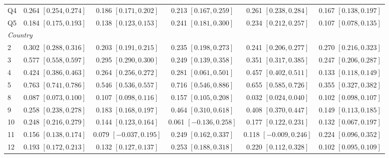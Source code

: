\begin{landscape}
\begin{longtable}{lccccc}
Q4 & 0.264 {\scriptsize$[0.254,0.274]$} & 0.186 {\scriptsize$[0.171,0.202]$} & 0.213 {\scriptsize$[0.167,0.259]$} & 0.261 {\scriptsize$[0.238,0.284]$} & 0.167 {\scriptsize$[0.138,0.197]$} \\
Q5 & 0.184 {\scriptsize$[0.175,0.193]$} & 0.138 {\scriptsize$[0.123,0.153]$} & 0.241 {\scriptsize$[0.181,0.300]$} & 0.234 {\scriptsize$[0.212,0.257]$} & 0.107 {\scriptsize$[0.078,0.135]$} \\
\midrule
\multicolumn{6}{l}{\textit{Country}} \\
2 & 0.302 {\scriptsize$[0.288,0.316]$} & 0.203 {\scriptsize$[0.191,0.215]$} & 0.235 {\scriptsize$[0.198,0.273]$} & 0.241 {\scriptsize$[0.206,0.277]$} & 0.270 {\scriptsize$[0.216,0.323]$} \\
3 & 0.577 {\scriptsize$[0.558,0.597]$} & 0.295 {\scriptsize$[0.290,0.300]$} & 0.249 {\scriptsize$[0.139,0.358]$} & 0.351 {\scriptsize$[0.317,0.385]$} & 0.247 {\scriptsize$[0.206,0.287]$} \\
4 & 0.424 {\scriptsize$[0.386,0.463]$} & 0.264 {\scriptsize$[0.256,0.272]$} & 0.281 {\scriptsize$[0.061,0.501]$} & 0.457 {\scriptsize$[0.402,0.511]$} & 0.133 {\scriptsize$[0.118,0.149]$} \\
5 & 0.763 {\scriptsize$[0.741,0.786]$} & 0.546 {\scriptsize$[0.536,0.557]$} & 0.716 {\scriptsize$[0.546,0.886]$} & 0.655 {\scriptsize$[0.585,0.726]$} & 0.355 {\scriptsize$[0.327,0.382]$} \\
8 & 0.087 {\scriptsize$[0.073,0.100]$} & 0.107 {\scriptsize$[0.098,0.116]$} & 0.157 {\scriptsize$[0.105,0.208]$} & 0.032 {\scriptsize$[0.024,0.040]$} & 0.102 {\scriptsize$[0.098,0.107]$} \\
9 & 0.258 {\scriptsize$[0.238,0.278]$} & 0.183 {\scriptsize$[0.168,0.197]$} & 0.464 {\scriptsize$[0.310,0.618]$} & 0.408 {\scriptsize$[0.370,0.447]$} & 0.149 {\scriptsize$[0.113,0.185]$} \\
10 & 0.248 {\scriptsize$[0.216,0.279]$} & 0.144 {\scriptsize$[0.123,0.164]$} & 0.061 {\scriptsize$[-0.136,0.258]$} & 0.177 {\scriptsize$[0.122,0.231]$} & 0.132 {\scriptsize$[0.067,0.197]$} \\
11 & 0.156 {\scriptsize$[0.138,0.174]$} & 0.079 {\scriptsize$[-0.037,0.195]$} & 0.249 {\scriptsize$[0.162,0.337]$} & 0.118 {\scriptsize$[-0.009,0.246]$} & 0.224 {\scriptsize$[0.096,0.352]$} \\
12 & 0.193 {\scriptsize$[0.172,0.213]$} & 0.132 {\scriptsize$[0.127,0.137]$} & 0.253 {\scriptsize$[0.188,0.318]$} & 0.220 {\scriptsize$[0.112,0.328]$} & 0.102 {\scriptsize$[0.095,0.109]$} \\

\end{longtable}
\end{landscape}
